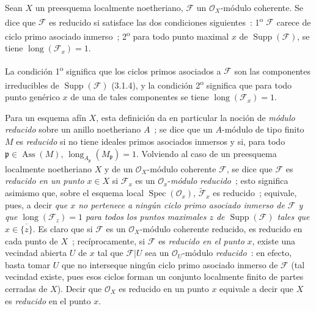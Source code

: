 \begin{definition}[3.2.2]
\label{IV.2.3.2.2-fr}
Sean $X$ un preesquema localmente noetheriano, $\mathcal F$ un
$\mathcal O_X$-módulo coherente. Se dice que $\mathcal F$ es reducido
si satisface las dos condiciones siguientes~: 1\textsuperscript{o}
$\mathcal F$ carece de ciclo primo asociado inmerso~; 2\textsuperscript{o}
para todo punto maximal $x$ de $\operatorname{Supp}(\mathcal F)$, se tiene
$\operatorname{long}(\mathcal F_x)=1$.
\end{definition}

La condición 1\textsuperscript{o} significa que los ciclos primos asociados a
$\mathcal F$ son las componentes irreducibles de
$\operatorname{Supp}(\mathcal F)$ (3.1.4), y la condición
2\textsuperscript{o} significa que para todo punto genérico $x$ de una de tales
componentes se tiene $\operatorname{long}(\mathcal F_x)=1$.

Para un esquema afín $X$, esta definición da en particular la noción de
\emph{módulo reducido} sobre un anillo noetheriano $A$~; se dice que un
$A$-módulo de tipo finito $M$ es \emph{reducido} si no tiene ideales primos
asociados inmersos y si, para todo
$\mathfrak p\in\operatorname{Ass}(M)$,
$\operatorname{long}_{A_\mathfrak p}(M_\mathfrak p)=1$. Volviendo al caso de
un preesquema localmente noetheriano $X$ y de un $\mathcal O_X$-módulo
coherente $\mathcal F$, se dice que $\mathcal F$ es \emph{reducido en un
punto} $x\in X$ si $\mathcal F_x$ es un $\mathcal O_x$-\emph{módulo reducido}~; esto
significa asimismo que, sobre el esquema local
$\operatorname{Spec}(\mathcal O_x)$, $\widetilde{\mathcal F}_x$ es reducido~;
equivale, pues, a decir \emph{que $x$ no pertenece a ningún ciclo primo
asociado inmerso de $\mathcal F$ y que
$\operatorname{long}(\mathcal F_z)=1$ para todos los puntos maximales $z$ de
$\operatorname{Supp}(\mathcal F)$ tales que $x\in\overline{\{z\}}$}. Es claro
que si $\mathcal F$ es un $\mathcal O_X$-módulo coherente reducido, es
reducido en cada punto de $X$~; recíprocamente, si $\mathcal F$ es
\emph{reducido en el punto} $x$, existe una vecindad abierta $U$ de $x$ tal que
$\mathcal F|U$ sea un $\mathcal O_U$-módulo \emph{reducido}~: en efecto,
basta tomar $U$ que no interseque ningún ciclo primo asociado inmerso de
$\mathcal F$ (tal vecindad existe, pues esos ciclos forman un conjunto
localmente finito de partes
cerradas de $X$). Decir que $\mathcal O_X$ es reducido en un punto $x$
equivale a decir que $X$ es \emph{reducido} en el punto $x$.
